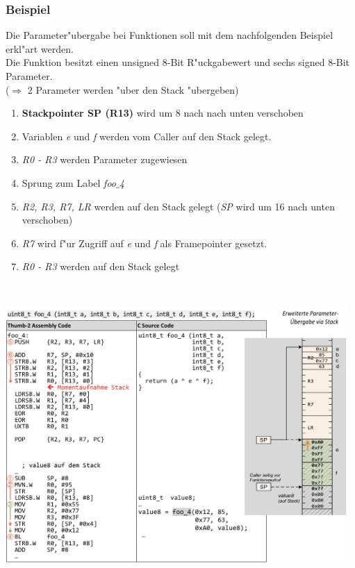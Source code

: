 \subsubsection{Beispiel}
	Die Parameter"ubergabe bei Funktionen soll mit dem nachfolgenden Beispiel erkl"art werden. \\
	Die Funktion besitzt einen unsigned 8-Bit R"uckgabewert und sechs signed 8-Bit Parameter. \\($\Rightarrow$ 2 Parameter werden "uber den Stack "ubergeben)\\

\begin{minipage}{5cm}
	\begin{enumerate}
		\item \textbf{Stackpointer SP (R13)} wird um 8 nach nach unten verschoben
		\item  Variablen \textit{e} und \textit{f} werden vom Caller auf den Stack gelegt.
		\item \textit{R0 - R3} werden Parameter zugewiesen
		\item Sprung zum Label \textit{foo$\_$4}
		\item \textit{R2, R3, R7, LR} werden auf den Stack gelegt (\textit{SP} wird um 16 nach unten verschoben)
		\item \textit{R7} wird f"ur Zugriff auf \textit{e} und \textit{f} als Framepointer gesetzt.
		\item \textit{R0 - R3} werden auf den Stack gelegt
	\end{enumerate}
\end{minipage}
%
\begin{minipage}{0.25cm}
	\-\
\end{minipage}
%
\begin{minipage}{13cm}
	\includegraphics[width=13cm]{images/parameteruebergabe_stack}
\end{minipage}
\newpage